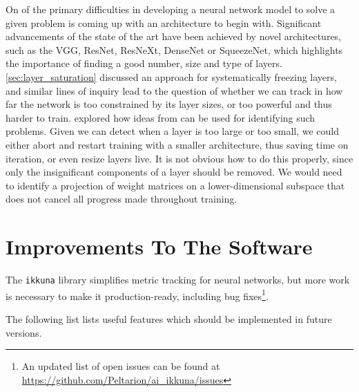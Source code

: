 On of the primary difficulties in developing a neural network model to solve a
given problem is coming up with an architecture to begin with. Significant
advancements of the state of the art have been achieved by novel architectures,
such as the VGG, ResNet, ResNeXt, DenseNet or SqueezeNet, which highlights the
importance of finding a good number, size and type of layers.
\cref{sec:layer_saturation} discussed an approach for systematically freezing
layers, and similar lines of inquiry lead to the question of whether we can
track in how far the network is too constrained by its layer sizes, or too
powerful and thus harder to train. \citet{shenk2018} explored how ideas from
\citep{raghu2017svcca} can be used for identifying such problems. Given we can
detect when a layer is too large or too small, we could either abort and restart
training with a smaller architecture, thus saving time on iteration, or even
resize layers live. It is not obvious how to do this properly, since only the
insignificant components of a layer should be removed. We would need to identify
a projection of weight matrices on a lower-dimensional subspace that does not
cancel all progress made throughout training.


\section{Improvements To The Software}%
\label{sec:improvements_to_the_software}

The \texttt{ikkuna} library simplifies metric tracking for neural networks, but
more work is necessary to make it production-ready, including bug
fixes\footnote{An updated list of open issues can  be found at
\url{https://github.com/Peltarion/ai_ikkuna/issues}}.

The following list lists useful features which should be implemented in future
versions.


